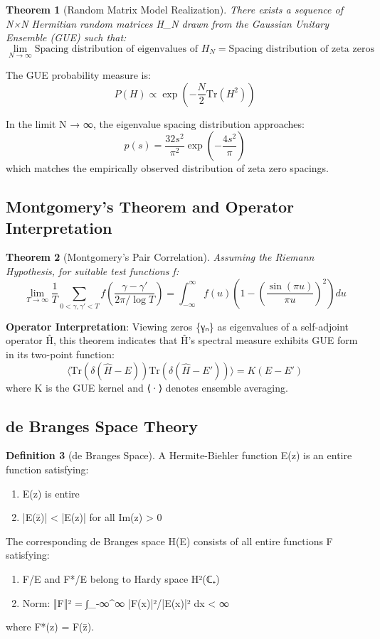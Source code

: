 \documentclass[12pt]{article}
\theoremstyle{plain}
\newtheorem{theorem}{Theorem}[section]
\theoremstyle{definition}
\newtheorem{definition}[theorem]{Definition}
\begin{document}
\begin{theorem}[Random Matrix Model Realization]
There exists a sequence of N×N Hermitian random matrices H_N drawn from the Gaussian Unitary Ensemble (GUE) such that:
$$\lim_{N \to \infty} \text{Spacing distribution of eigenvalues of } H_N = \text{Spacing distribution of zeta zeros}$$
\end{theorem}

The GUE probability measure is:
$$P(H) \propto \exp\left(-\frac{N}{2} \text{Tr}(H^2)\right)$$

In the limit N → ∞, the eigenvalue spacing distribution approaches:
$$p(s) = \frac{32s^2}{\pi^2} \exp\left(-\frac{4s^2}{\pi}\right)$$
which matches the empirically observed distribution of zeta zero spacings.

\subsection{Montgomery's Theorem and Operator Interpretation}

\begin{theorem}[Montgomery's Pair Correlation]
Assuming the Riemann Hypothesis, for suitable test functions f:
$$\lim_{T \to \infty} \frac{1}{T} \sum_{0 < \gamma, \gamma' < T} f\left(\frac{\gamma - \gamma'}{2\pi/\log T}\right) = \int_{-\infty}^{\infty} f(u) \left(1 - \left(\frac{\sin(\pi u)}{\pi u}\right)^2\right) du$$
\end{theorem}

\textbf{Operator Interpretation}: Viewing zeros \{γₙ\} as eigenvalues of a self-adjoint operator Ĥ, this theorem indicates that Ĥ's spectral measure exhibits GUE form in its two-point function:
$$\langle \text{Tr}(\delta(\hat{H} - E)) \text{Tr}(\delta(\hat{H} - E')) \rangle = K(E - E')$$
where K is the GUE kernel and ⟨·⟩ denotes ensemble averaging.

\subsection{de Branges Space Theory}

\begin{definition}[de Branges Space]
A Hermite-Biehler function E(z) is an entire function satisfying:
\begin{enumerate}
\item E(z) is entire
\item |E(z̄)| < |E(z)| for all Im(z) > 0
\end{enumerate}

The corresponding de Branges space H(E) consists of all entire functions F satisfying:
\begin{enumerate}
\item F/E and F*/E belong to Hardy space H²(ℂ₊)
\item Norm: ‖F‖² = ∫_{-∞}^{∞} |F(x)|²/|E(x)|² dx < ∞
\end{enumerate}
where F*(z) = F(z̄).
\end{definition}
\end{document}
